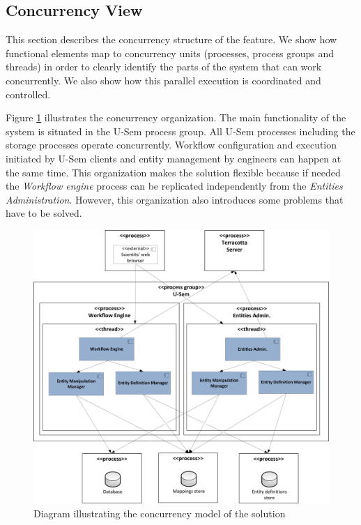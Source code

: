 \subsection{Concurrency View}

This section describes the concurrency structure of the feature. We show how functional elements map to concurrency units (processes, process groups and threads) in order to clearly identify the parts of the system that can work concurrently. We also show how this parallel execution is coordinated and controlled.

Figure \ref{fig:storageConc} illustrates the concurrency organization. The main functionality of the system is situated in the U-Sem process group. All U-Sem processes including the storage processes operate concurrently. Workflow configuration and execution initiated by U-Sem clients and entity management by engineers can happen at the same time. This organization makes the solution flexible because if needed the \textit{Workflow engine} process can be replicated independently from the \textit{Entities Administration}. However, this organization also introduces some problems that have to be solved.

\begin{figure}[h!]
  \centering
  	\includegraphics[scale=0.6]{storage/functional/concur.png}
  \caption{Diagram illustrating the concurrency model of the solution}
  \label{fig:storageConc}
\end{figure}

